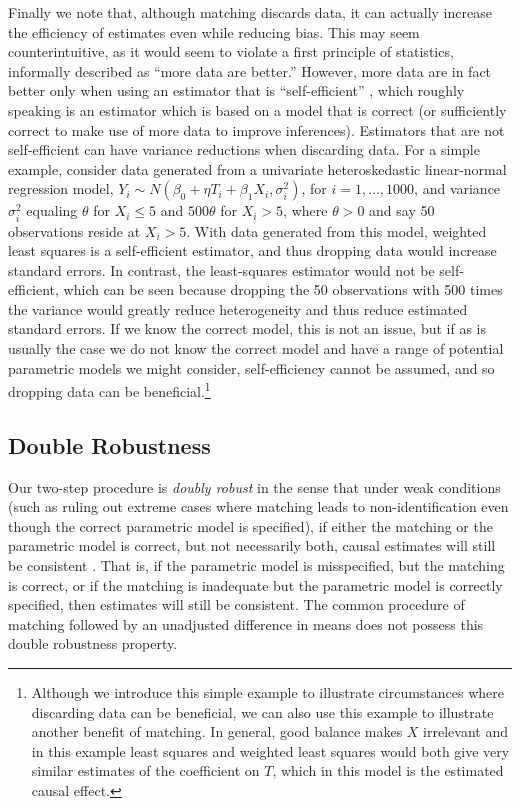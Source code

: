 \documentclass[11pt,titlepage]{article}
\begin{document}
Finally we note that, although matching discards data, it can actually
increase the efficiency of estimates even while reducing bias.  This
may seem counterintuitive, as it would seem to violate a first
principle of statistics, informally described as ``more data are
better.''  However, more data are in fact better only when using an
estimator that is ``self-efficient'' \citep{MenRom03}, which roughly
speaking is an estimator which is based on a model that is correct (or
sufficiently correct to make use of more data to improve inferences).
Estimators that are not self-efficient can have variance reductions
when discarding data.  For a simple example, consider data generated
from a univariate heteroskedastic linear-normal regression model,
$Y_i\sim N(\beta_0+\eta T_i+\beta_1 X_i,\sigma_i^2)$, for
$i=1,\dots,1000$, and variance $\sigma^2_i$ equaling $\theta$ for
$X_i\leq 5$ and $500\theta$ for $X_i>5$, where $\theta>0$ and say 50
observations reside at $X_i>5$.  With data generated from this model,
weighted least squares is a self-efficient estimator, and thus
dropping data would increase standard errors.  In contrast, the
least-squares estimator would not be self-efficient, which can be seen
because dropping the 50 observations with 500 times the variance would
greatly reduce heterogeneity and thus reduce estimated standard
errors.  If we know the correct model, this is not an issue, but if as
is usually the case we do not know the correct model and have a range
of potential parametric models we might consider, self-efficiency
cannot be assumed, and so dropping data can be
beneficial.\footnote{Although we introduce this simple example to
  illustrate circumstances where discarding data can be beneficial, we
  can also use this example to illustrate another benefit of matching.
  In general, good balance makes $X$ irrelevant and in this example
  least squares and weighted least squares would both give very
  similar estimates of the coefficient on $T$, which in this model is
  the estimated causal effect.}

\subsection{Double Robustness}
Our two-step procedure is \emph{doubly robust} in the sense that under
weak conditions (such as ruling out extreme cases where matching leads
to non-identification even though the correct parametric model is
specified), if either the matching or the parametric model is correct,
but not necessarily both, causal estimates will still be consistent
\citep[see][]{RobRot01}.  That is, if the parametric model is
misspecified, but the matching is correct, or if the matching is
inadequate but the parametric model is correctly specified, then
estimates will still be consistent.  The common procedure of matching
followed by an unadjusted difference in means does not possess this
double robustness property.
\end{document}
